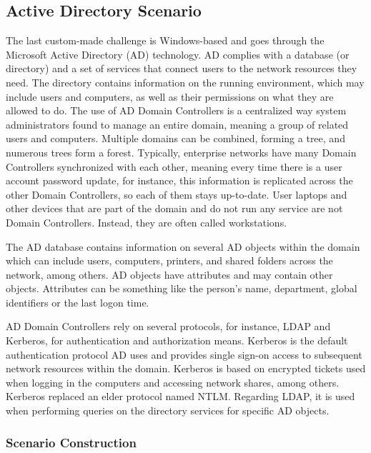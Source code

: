 
\subsection{Active Directory Scenario} \label{sec:validation_ad_scenario}

The last custom-made challenge is Windows-based and goes through the Microsoft Active Directory (AD) technology. AD complies with a database (or directory) and a set of services that connect users to the network resources they need. The directory contains information on the running environment, which may include users and computers, as well as their permissions on what they are allowed to do. The use of AD Domain Controllers is a centralized way system administrators found to manage an entire domain, meaning a group of related users and computers. Multiple domains can be combined, forming a tree, and numerous trees form a forest. Typically, enterprise networks have many Domain Controllers synchronized with each other, meaning every time there is a user account password update, for instance, this information is replicated across the other Domain Controllers, so each of them stays up-to-date. User laptops and other devices that are part of the domain and do not run any service are not Domain Controllers. Instead, they are often called workstations.

The AD database contains information on several AD objects within the domain which can include users, computers, printers, and shared folders across the network, among others. AD objects have attributes and may contain other objects. Attributes can be something like the person's name, department, global identifiers or the last logon time.

AD Domain Controllers rely on several protocols, for instance, LDAP and Kerberos, for authentication and authorization means. Kerberos is the default authentication protocol AD uses and provides single sign-on access to subsequent network resources within the domain. Kerberos is based on encrypted tickets used when logging in the computers and accessing network shares, among others. Kerberos replaced an elder protocol named NTLM. Regarding LDAP, it is used when performing queries on the directory services for specific AD objects.

\subsubsection{Scenario Construction} \label{sec:validation_ad_scenario_construction}

